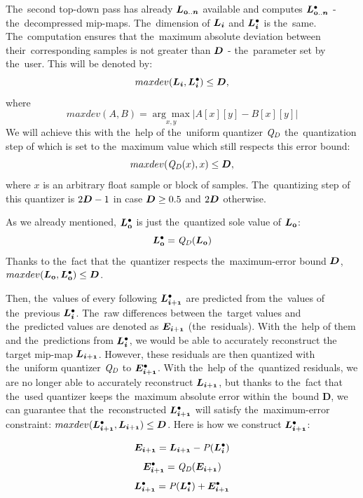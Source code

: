 The~second top-down pass has already $\lnorm{0..n}$ available and computes $\ldot{0..n}$ - the~decompressed mip-maps. The~dimension of $\lnorm{i}$ and $\ldot{i}$ is the~same. The~computation ensures that the~maximum absolute deviation between their~corresponding samples is not greater than $\objnorm{D}{}$ - the~parameter set by the~user. This will be denoted by:
$$maxdev(\lnorm{i}, \ldot{i}) \leq \objnorm{D}{},$$
where
$$maxdev(A, B) = \underset{x, y}{\arg\max}|A[x][y] - B[x][y]|$$
We will achieve this with the~help of the~uniform quantizer $\mathit{Q_{D}}$ the~quantization step of which is set to the~maximum value which still respects this error bound:
$$maxdev(\dnorm(x), x) \leq \objnorm{D}{},$$
where $x$ is an arbitrary float sample or block of samples.
The~quantizing step of this quantizer is $2\objnorm{D}{} - 1$ in case $\objnorm{D}{} \geq 0.5$ and $2\objnorm{D}{}$ otherwise.


As we already mentioned, $\ldot{0}$ is just the~quantized sole value of $\lnorm{0}$:
$$\ldot{0} = \dnorm(\lnorm{0})$$
Thanks to the~fact that the~quantizer respects the~maximum-error bound $\objnorm{D}{}$, $maxdev(\lnorm{0}, \ldot{0}) \leq \objnorm{D}{}$.


Then, the~values of every following $\ldot{i+1}$ are predicted from the~values of the~previous $\ldot{i}$. The~raw differences between the~target values and the~predicted values are denoted as $\objnorm{E}{i+1}$ (the~residuals). With the~help of them and the~predictions from $\ldot{i}$, we would be able to accurately reconstruct the target mip-map $\lnorm{i+1}$. However, these residuals are then quantized with the~uniform quantizer $\mathit{Q_{D}}$ to $\objdot{E}{i+1}$. With the~help of the~quantized residuals, we are no longer able to accurately reconstruct $\lnorm{i+1}$, but thanks to the~fact that the~used quantizer keeps the~maximum absolute error within the~bound $\mathbold{D}$, we can guarantee that the~reconstructed $\ldot{i+1}$ will satisfy the~maximum-error constraint: $maxdev(\ldot{i+1}, \lnorm{i+1}) \leq \objnorm{D}{}$. Here is how we construct $\ldot{i+1}$:

$$\objnorm{E}{i+1} = \lnorm{i+1} - \opnorm{P}{}(\ldot{i})$$
$$\objdot{E}{i+1} = \opnorm{Q}{D}(\objnorm{E}{i+1})$$
\begin{equation}
\label{eq:nextLevel}
\ldot{i+1} = \opnorm{P}{}(\ldot{i}) + \objdot{E}{i+1}
\end{equation}

